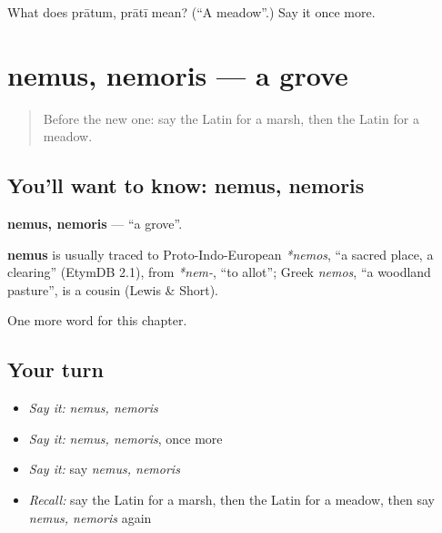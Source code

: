 \begin{tcolorbox}[breakable,colback=teal!4,colframe=teal!35!black,title={Before you move on}]
What does prātum, prātī mean? (\textquotedblleft{}A meadow\textquotedblright{}.) Say it once more.
\end{tcolorbox}
\section[nemus, nemoris]{nemus, nemoris — a grove}

\label{lesson:LA-C196-nemus}



\begin{quote}
Before the new one: say the Latin for a marsh, then the Latin for a meadow.
\end{quote}

\subsection*{You'll want to know: nemus, nemoris}
\textbf{nemus, nemoris} — \textquotedblleft{}a grove\textquotedblright{}.

\begin{cousinweb}
\textbf{nemus} is usually traced to Proto-Indo-European \emph{*nemos}, \textquotedblleft{}a sacred place, a clearing\textquotedblright{} (EtymDB 2.1), from \emph{*nem-}, \textquotedblleft{}to allot\textquotedblright{}; Greek \emph{nemos}, \textquotedblleft{}a woodland pasture\textquotedblright{}, is a cousin (Lewis \& Short).
\end{cousinweb}

\begin{grammarlens}[title={What you've built}]
One more word for this chapter.
\end{grammarlens}

\subsection*{Your turn}
\begin{itemize}
\raggedright
  \item \emph{Say it:} \emph{nemus, nemoris}
  \item \emph{Say it:} \emph{nemus, nemoris}, once more
  \item \emph{Say it:} say \emph{nemus, nemoris}
  \item \emph{Recall:} say the Latin for a marsh, then the Latin for a meadow, then say \emph{nemus, nemoris} again
\end{itemize}

